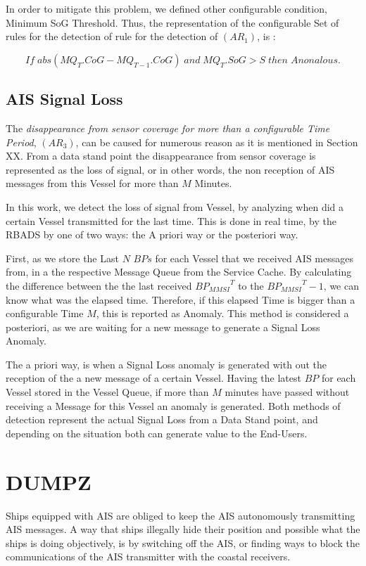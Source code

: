In order to mitigate this problem, we defined other configurable condition, Minimum SoG Threshold. Thus, the representation of the configurable Set of rules for the detection of rule for the detection of $(AR_1)$, is :

\[ If\; abs(MQ_{T}.CoG - MQ_{T-1}.CoG)\;and\; MQ_T.SoG > S\; then\; Anonalous.\]

\subsection{AIS Signal Loss}
\label{subsection: 4 AIS Signal Loss}
The \textit{disappearance from sensor coverage for more than a configurable Time Period}, $(AR_3)$, can be caused for numerous reason as it is mentioned in Section XX. From a data stand point the disappearance from sensor coverage is represented as the loss of signal, or in other words, the non reception of AIS messages from this Vessel for more than $M$ Minutes.

In this work, we detect the loss of signal from Vessel, by analyzing when did a certain Vessel transmitted for the last time. This is done in real time, by the RBADS by one of two ways: the A priori way or the posteriori way.

First, as we store the Last $N$ $BPs$ for each Vessel that we received AIS messages from, in a the respective Message Queue from the Service Cache. By calculating the difference between the the last received ${BP_{MMSI}}^T$ to the ${BP_{MMSI}}^T-1$, we can know what was the elapsed time. Therefore, if this elapsed Time is bigger than a configurable Time $M$, this is reported as Anomaly. This method is considered a posteriori, as we are waiting for a new message to generate a Signal Loss Anomaly.

The a priori way, is when a Signal Loss anomaly is generated with out the reception of the a new message of a certain Vessel. Having the latest $BP$ for each Vessel stored in the Vessel Queue, if more than $M$ minutes have passed without receiving a Message for this Vessel an anomaly is generated. Both methods of detection represent the actual Signal Loss from a Data Stand point, and depending on the situation both can generate value to the End-Users. 

\iffalse
\section{DUMPZ}

Ships equipped with AIS are obliged to keep the AIS autonomously transmitting AIS messages. A way that ships illegally hide their position and possible what the ships is doing objectively, is by switching off the AIS, or finding ways to block the communications of the AIS transmitter with the coastal receivers.

